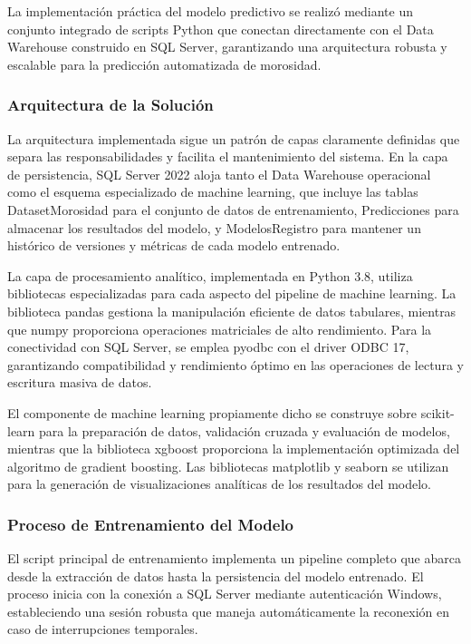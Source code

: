 La implementación práctica del modelo predictivo se realizó mediante un conjunto integrado de scripts Python que conectan directamente con el Data Warehouse construido en SQL Server, garantizando una arquitectura robusta y escalable para la predicción automatizada de morosidad.

\subsubsection{Arquitectura de la Solución}

La arquitectura implementada sigue un patrón de capas claramente definidas que separa las responsabilidades y facilita el mantenimiento del sistema. En la capa de persistencia, SQL Server 2022 aloja tanto el Data Warehouse operacional como el esquema especializado de machine learning, que incluye las tablas DatasetMorosidad para el conjunto de datos de entrenamiento, Predicciones para almacenar los resultados del modelo, y ModelosRegistro para mantener un histórico de versiones y métricas de cada modelo entrenado.

La capa de procesamiento analítico, implementada en Python 3.8, utiliza bibliotecas especializadas para cada aspecto del pipeline de machine learning. La biblioteca pandas gestiona la manipulación eficiente de datos tabulares, mientras que numpy proporciona operaciones matriciales de alto rendimiento. Para la conectividad con SQL Server, se emplea pyodbc con el driver ODBC 17, garantizando compatibilidad y rendimiento óptimo en las operaciones de lectura y escritura masiva de datos.

El componente de machine learning propiamente dicho se construye sobre scikit-learn para la preparación de datos, validación cruzada y evaluación de modelos, mientras que la biblioteca xgboost proporciona la implementación optimizada del algoritmo de gradient boosting. Las bibliotecas matplotlib y seaborn se utilizan para la generación de visualizaciones analíticas de los resultados del modelo.

\subsubsection{Proceso de Entrenamiento del Modelo}

El script principal de entrenamiento implementa un pipeline completo que abarca desde la extracción de datos hasta la persistencia del modelo entrenado. El proceso inicia con la conexión a SQL Server mediante autenticación Windows, estableciendo una sesión robusta que maneja automáticamente la reconexión en caso de interrupciones temporales.


